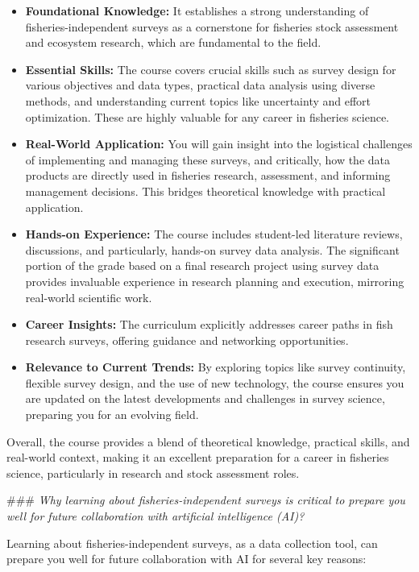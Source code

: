 \documentclass[
  letterpaper,
  oneside,
  open=any]{scrbook}
\providecommand{\tightlist}{%
  \setlength{\itemsep}{0pt}\setlength{\parskip}{0pt}}\usepackage{longtable,booktabs,array}
\begin{document}
\begin{itemize}
\tightlist
\item
  \textbf{Foundational Knowledge:} It establishes a strong understanding
  of fisheries-independent surveys as a cornerstone for fisheries stock
  assessment and ecosystem research, which are fundamental to the field.
\item
  \textbf{Essential Skills:} The course covers crucial skills such as
  survey design for various objectives and data types, practical data
  analysis using diverse methods, and understanding current topics like
  uncertainty and effort optimization. These are highly valuable for any
  career in fisheries science.
\item
  \textbf{Real-World Application:} You will gain insight into the
  logistical challenges of implementing and managing these surveys, and
  critically, how the data products are directly used in fisheries
  research, assessment, and informing management decisions. This bridges
  theoretical knowledge with practical application.
\item
  \textbf{Hands-on Experience:} The course includes student-led
  literature reviews, discussions, and particularly, hands-on survey
  data analysis. The significant portion of the grade based on a final
  research project using survey data provides invaluable experience in
  research planning and execution, mirroring real-world scientific work.
\item
  \textbf{Career Insights:} The curriculum explicitly addresses career
  paths in fish research surveys, offering guidance and networking
  opportunities.
\item
  \textbf{Relevance to Current Trends:} By exploring topics like survey
  continuity, flexible survey design, and the use of new technology, the
  course ensures you are updated on the latest developments and
  challenges in survey science, preparing you for an evolving field.
\end{itemize}

Overall, the course provides a blend of theoretical knowledge, practical
skills, and real-world context, making it an excellent preparation for a
career in fisheries science, particularly in research and stock
assessment roles.

\#\#\# \emph{Why learning about fisheries-independent surveys is
critical to prepare you well for future collaboration with artificial
intelligence (AI)?}

Learning about fisheries-independent surveys, as a data collection tool,
can prepare you well for future collaboration with AI for several key
reasons:
\end{document}

